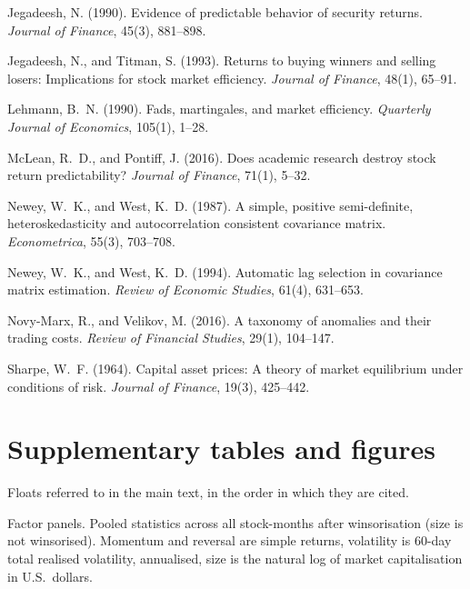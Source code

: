 \documentclass[11pt,a4paper]{article}
\begin{document}
\begin{thebibliography}{99}
Jegadeesh, N. (1990). Evidence of predictable behavior of security returns. \textit{Journal of Finance}, 45(3), 881--898.

Jegadeesh, N., and Titman, S. (1993). Returns to buying winners and selling losers: Implications for stock market efficiency. \textit{Journal of Finance}, 48(1), 65--91.

Lehmann, B.~N. (1990). Fads, martingales, and market efficiency. \textit{Quarterly Journal of Economics}, 105(1), 1--28.

McLean, R.~D., and Pontiff, J. (2016). Does academic research destroy stock return predictability? \textit{Journal of Finance}, 71(1), 5--32.

Newey, W.~K., and West, K.~D. (1987). A simple, positive semi-definite, heteroskedasticity and autocorrelation consistent covariance matrix. \textit{Econometrica}, 55(3), 703--708.

Newey, W.~K., and West, K.~D. (1994). Automatic lag selection in covariance matrix estimation. \textit{Review of Economic Studies}, 61(4), 631--653.

Novy-Marx, R., and Velikov, M. (2016). A taxonomy of anomalies and their trading costs. \textit{Review of Financial Studies}, 29(1), 104--147.

Sharpe, W.~F. (1964). Capital asset prices: A theory of market equilibrium under conditions of risk. \textit{Journal of Finance}, 19(3), 425--442.

\end{thebibliography}

\appendix
\renewcommand{\thetable}{A\arabic{table}}
\renewcommand{\thefigure}{A\arabic{figure}}
\setcounter{table}{0}
\setcounter{figure}{0}

\section{Supplementary tables and figures}
\label{app:supp}

Floats referred to in the main text, in the order in which they are cited.

\begin{table}[!htbp]
\centering
\caption{Factor panels. Pooled statistics across all stock-months after winsorisation (size is not winsorised). Momentum and reversal are simple returns, volatility is 60-day total realised volatility, annualised, size is the natural log of market capitalisation in U.S.\ dollars.}
\label{tab:factor_summary}
\small

\end{table}
\end{document}
